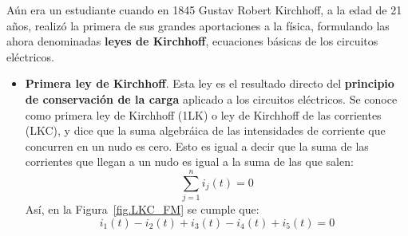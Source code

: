 	
	Aún era un estudiante cuando en 1845 Gustav Robert Kirchhoff, a la edad de 21 años, realizó la primera de sus grandes aportaciones a la física, formulando las ahora denominadas \textbf{leyes de Kirchhoff}, ecuaciones básicas de los circuitos eléctricos.
	
	\begin{itemize}
		\item \textbf{Primera ley de Kirchhoff}. Esta ley es el resultado directo del \textbf{principio de conservación de la carga} aplicado a los circuitos eléctricos. Se conoce como primera ley de Kirchhoff (1LK) o ley de Kirchhoff de las corrientes (LKC), y dice que la suma algebráica de las intensidades de corriente que concurren en un nudo es cero. Esto es igual a decir que la suma de las corrientes que llegan a un nudo es igual a la suma de las que salen: 
		\begin{equation}
			\boxed{\sum_{j=1}^n i_j(t)=0}
		\end{equation}
		Así, en la Figura~\ref{fig.LKC_FM} se cumple que:
		\begin{equation*}
			i_1(t) - i_2(t) + i_3(t) - i_4(t) + i_5(t) = 0
		\end{equation*}
		

\end{itemize}
